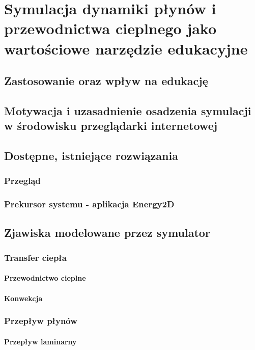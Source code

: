 \documentclass[pdflatex,12pt]{aghdpl}
\author{Piotr Janik}
\date{2012}
\begin{document}
\titlepages



\tableofcontents
\clearpage

	
	
\chapter{Symulacja dynamiki płynów i przewodnictwa cieplnego jako wartościowe narzędzie edukacyjne}
	\section{Zastosowanie oraz wpływ na edukację}
	\section{Motywacja i uzasadnienie osadzenia symulacji w środowisku przeglądarki internetowej}
	\section{Dostępne, istniejące rozwiązania}
		\subsection{Przegląd}
		\subsection{Prekursor systemu - aplikacja Energy2D}
	\section{Zjawiska modelowane przez symulator}
		\subsection{Transfer ciepła}
			\subsubsection{Przewodnictwo cieplne}
			\subsubsection{Konwekcja}
		\subsection{Przepływ płynów}
			\subsubsection{Przepływ laminarny}
\end{document}
